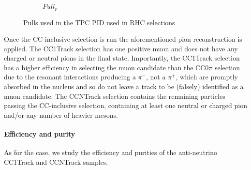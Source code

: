 \begin{figure}[!h]
\begin{subfigure}[t]{0.32\textwidth}
		\caption{$Pull_p$}
	\end{subfigure}
	\caption{Pulls used in the TPC PID used in \numubar RHC selections}
	\label{fig:numubar_pulls}
\end{figure}

Once the \numubar CC-inclusive selection is run the aforementioned pion reconstruction is applied. The \numubar CC1Track selection has one positive muon and does not have any charged or neutral pions in the final state. Importantly, the \numubar CC1Track selection has a higher efficiency in selecting the muon candidate than the \numu CC0$\pi$ selection due to the \numubar resonant interactions producing a $\pi^-$, not a $\pi^+$, which are promptly absorbed in the nucleus and so do not leave a track to be (falsely) identified as a muon candidate. The \numubar CCNTrack selection contains the remaining particles passing the \numubar CC-inclusive selection, containing at least one neutral or charged pion and/or any number of heavier mesons.

\paragraph{Efficiency and purity}
As for the \numu case, we study the efficiency and purities of the anti-neutrino CC1Track and CCNTrack samples.

